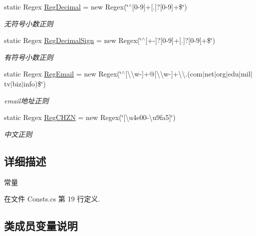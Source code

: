\begin{DoxyCompactItemize}
static Regex \hyperlink{class_x_c_l_net_tools_1_1_common_1_1_consts_ae458af39aa12dc5dc1ec960a8c885aa5}{Reg\+Decimal} = new Regex(\char`\"{}$^\wedge$\mbox{[}0-\/9\mbox{]}+\mbox{[}.\mbox{]}?\mbox{[}0-\/9\mbox{]}+\$\char`\"{})
\begin{DoxyCompactList}\small\item\em 无符号小数正则 \end{DoxyCompactList}\item 
static Regex \hyperlink{class_x_c_l_net_tools_1_1_common_1_1_consts_a06acd9076fbb4b584a984142589eca11}{Reg\+Decimal\+Sign} = new Regex(\char`\"{}$^\wedge$\mbox{[}+-\/\mbox{]}?\mbox{[}0-\/9\mbox{]}+\mbox{[}.\mbox{]}?\mbox{[}0-\/9\mbox{]}+\$\char`\"{})
\begin{DoxyCompactList}\small\item\em 有符号小数正则 \end{DoxyCompactList}\item 
static Regex \hyperlink{class_x_c_l_net_tools_1_1_common_1_1_consts_a5a55d66840fa9e259ea63d77ae6b3d88}{Reg\+Email} = new Regex(\char`\"{}$^\wedge$\mbox{[}\textbackslash{}\textbackslash{}w-\/\mbox{]}+@\mbox{[}\textbackslash{}\textbackslash{}w-\/\mbox{]}+\textbackslash{}\textbackslash{}.(com$\vert$net$\vert$org$\vert$edu$\vert$mil$\vert$tv$\vert$biz$\vert$info)\$\char`\"{})
\begin{DoxyCompactList}\small\item\em email地址正则 \end{DoxyCompactList}\item 
static Regex \hyperlink{class_x_c_l_net_tools_1_1_common_1_1_consts_aeb4f95ff285059a276d3191ada22bce5}{Reg\+C\+H\+ZN} = new Regex(\char`\"{}\mbox{[}\textbackslash{}u4e00-\/\textbackslash{}u9fa5\mbox{]}\char`\"{})
\begin{DoxyCompactList}\small\item\em 中文正则 \end{DoxyCompactList}\end{DoxyCompactItemize}


\subsection{详细描述}
常量 



在文件 Consts.\+cs 第 19 行定义.



\subsection{类成员变量说明}
